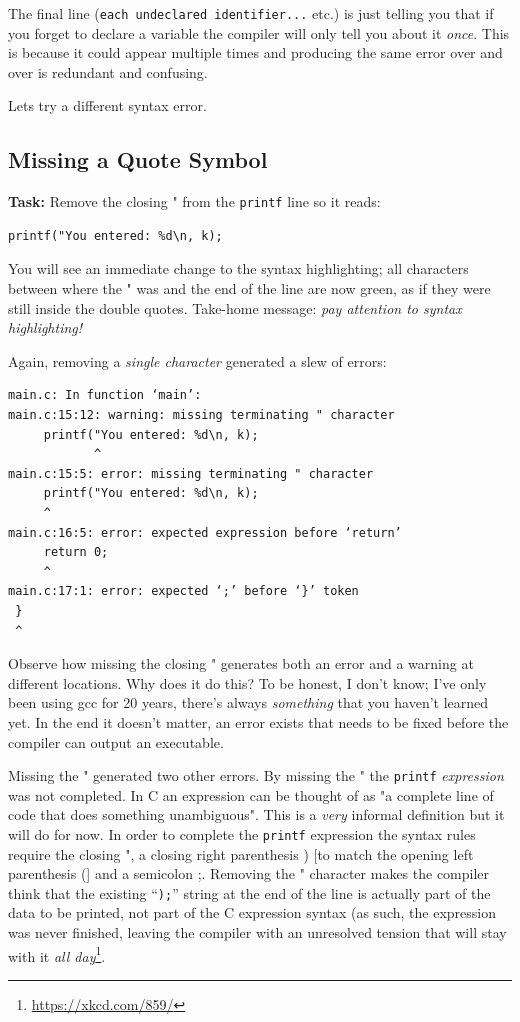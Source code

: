 \documentclass{lab}
\begin{document}
The final line (\texttt{each undeclared identifier...} etc.) is just telling you that if you forget to declare a variable the compiler will only tell you about it \textit{once}. This is because it could appear multiple times and producing the same error over and over is redundant and confusing.

Lets try a different syntax error.

\subsection{Missing a Quote Symbol}

\textbf{Task:} Remove the closing " from the \texttt{printf} line so it reads:

\begin{lstlisting}[style=CStyle]
printf("You entered: %d\n, k);
\end{lstlisting}

You will see an immediate change to the syntax highlighting; all characters between where the " was and the end of the line are now green, as if they were still inside the double quotes. Take-home message: \textit{pay attention to syntax highlighting!}

Again, removing a \textit{single character} generated a slew of errors:

\begin{lstlisting}[basicstyle=\ttfamily]
main.c: In function ‘main’:
main.c:15:12: warning: missing terminating " character
     printf("You entered: %d\n, k);
            ^
main.c:15:5: error: missing terminating " character
     printf("You entered: %d\n, k);
     ^
main.c:16:5: error: expected expression before ‘return’
     return 0;
     ^
main.c:17:1: error: expected ‘;’ before ‘}’ token
 }
 ^
\end{lstlisting}

Observe how missing the closing " generates both an error and a warning at different locations. Why does it do this? To be honest, I don't know; I've only been using gcc for 20 years, there's always \textit{something} that you haven't learned yet. In the end it doesn't matter, an error exists that needs to be fixed before the compiler can output an executable.

Missing the " generated two other errors. By missing the " the \texttt{printf} \textit{expression} was not completed. In C an expression can be thought of as "a complete line of code that does something unambiguous". This is a \textit{very} informal definition but it will do for now. In order to complete the \texttt{printf} expression the syntax rules require the closing ", a closing right parenthesis ) [to match the opening left parenthesis (] and a semicolon ;. Removing the " character makes the compiler think that the existing ``\texttt{);}'' string at the end of the line is actually part of the data to be printed, not part of the C expression syntax (as such, the expression was never finished, leaving the compiler with an unresolved tension that will stay with it \textit{all day}\footnote{\url{https://xkcd.com/859/}}.
\end{document}
